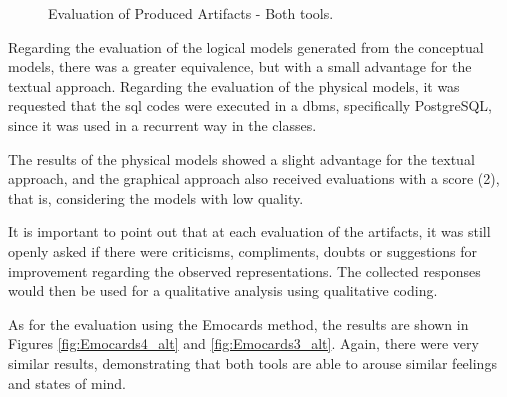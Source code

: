 \begin{figure}[!htb]
    \centering
    \caption{Evaluation of Produced Artifacts - Both tools.}
    \label{fig:ToolModelsEval}
    
\end{figure}

Regarding the evaluation of the logical models generated from the conceptual models, there was a greater equivalence, but with a small advantage for the textual approach.
Regarding the evaluation of the physical models, it was requested that the \ac{sql} codes were executed in a \ac{dbms}, specifically PostgreSQL, since it was used in a recurrent way in the classes.

The results of the physical models showed a slight advantage for the textual approach, and the graphical approach also received evaluations with a score (2), that is, considering the models with low quality.

It is important to point out that at each evaluation of the artifacts, it was still openly asked if there were criticisms, compliments, doubts or suggestions for improvement regarding the observed representations.
The collected responses would then be used for a qualitative analysis using qualitative coding.

As for the evaluation using the Emocards method, the results are shown in Figures \ref{fig:Emocards4_alt} and \ref{fig:Emocards3_alt}.
Again, there were very similar results, demonstrating that both tools are able to arouse similar feelings and states of mind.

